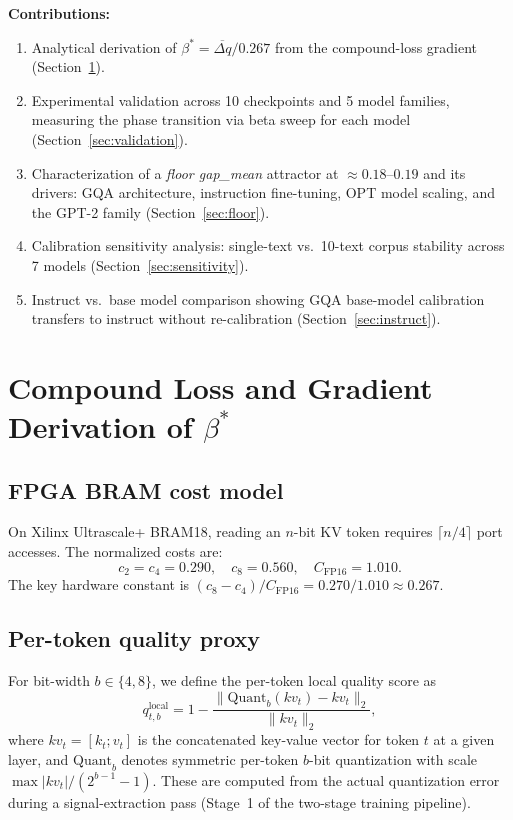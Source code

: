\documentclass{article}
\begin{document}
\textbf{Contributions:}
\begin{enumerate}
\item Analytical derivation of $\beta^* = \overline{\Delta q} / 0.267$ from the compound-loss
gradient (Section~\ref{sec:derivation}).
\item Experimental validation across 10 checkpoints and 5 model families, measuring the phase
transition via beta sweep for each model (Section~\ref{sec:validation}).
\item Characterization of a \emph{floor gap\_mean} attractor at $\approx 0.18$--$0.19$
and its drivers: GQA architecture, instruction fine-tuning, OPT model scaling, and the
GPT-2 family (Section~\ref{sec:floor}).
\item Calibration sensitivity analysis: single-text vs.\ 10-text corpus stability across
7 models (Section~\ref{sec:sensitivity}).
\item Instruct vs.\ base model comparison showing GQA base-model calibration transfers
to instruct without re-calibration (Section~\ref{sec:instruct}).
\end{enumerate}

\section{Compound Loss and Gradient Derivation of $\beta^*$}
\label{sec:derivation}

\subsection{FPGA BRAM cost model}

On Xilinx Ultrascale+ BRAM18, reading an $n$-bit KV token requires $\lceil n/4 \rceil$
port accesses. The normalized costs are:
\[
c_2 = c_4 = 0.290, \quad c_8 = 0.560, \quad C_\text{FP16} = 1.010.
\]
The key hardware constant is $(c_8 - c_4) / C_\text{FP16} = 0.270 / 1.010 \approx 0.267$.

\subsection{Per-token quality proxy}

For bit-width $b \in \{4, 8\}$, we define the per-token local quality score as
\[
q_{t,b}^\text{local} = 1 - \frac{\|\text{Quant}_b(kv_t) - kv_t\|_2}{\|kv_t\|_2},
\]
where $kv_t = [k_t; v_t]$ is the concatenated key-value vector for token $t$ at a given
layer, and $\text{Quant}_b$ denotes symmetric per-token $b$-bit quantization with scale
$\max|kv_t|/(2^{b-1}-1)$. These are computed from the actual quantization error during
a signal-extraction pass (Stage~1 of the two-stage training pipeline).
\end{document}
